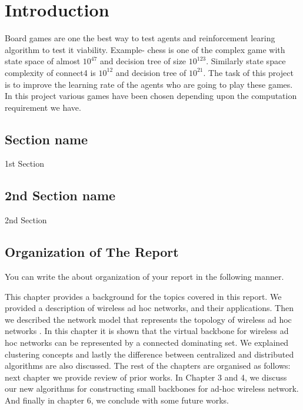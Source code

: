 \chapter{Introduction}
\hspace{3mm}
Board games are one the best way to test agents and reinforcement learing algorithm to test it viability. Example- chess is one of the complex game with state space of almost $10^{47}$ and decision tree of size $10^{123}$. Similarly state space complexity of connect4 is $10^{12}$ and decision tree of $10^{21}$. The task of this project is to improve the learning rate of the agents who are going to play these games. In this project various games have been chosen depending upon the computation requirement we have.

\section{Section name}
1st Section

\section{2nd Section name}

2nd Section

\section{Organization of The Report}

You can write the about organization of your report in the following manner.

This chapter provides a background for the topics covered in this
report. We provided a description of wireless ad hoc networks, and
their applications. Then we described the network model that
represents the topology of wireless ad hoc networks \cite{Omar2016}. In this
chapter it is shown that the virtual backbone for wireless ad hoc
networks can be represented by a connected dominating set. We
explained clustering concepts and lastly the difference between
centralized and distributed algorithms are also discussed. The
rest of the chapters are organised as follows: next chapter we
provide review of prior works. In Chapter 3 and 4, we discuss our
new algorithms for constructing small backbones for ad-hoc
wireless network. And finally in chapter 6, we conclude with some
future works.

